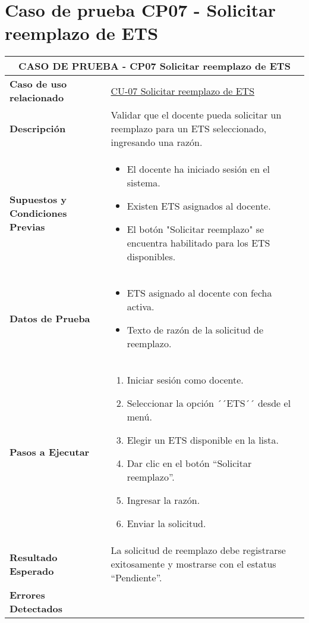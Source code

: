 \section{Caso de prueba CP07 - Solicitar reemplazo de ETS}

\begin{longtable}{|p{5cm}|p{10cm}|}
	\hline
	\multicolumn{2}{|c|}{\textbf{CASO DE PRUEBA - CP07 Solicitar reemplazo de ETS}} \\
	\hline
	\textbf{Caso de uso relacionado} & \hyperref[CU-07]{CU-07 Solicitar reemplazo de ETS} \\
	\hline
	\textbf{Descripción} & Validar que el docente pueda solicitar un reemplazo para un ETS seleccionado, ingresando una razón. \\
	\hline
	\textbf{Supuestos y Condiciones Previas} & 
	\begin{itemize}
		\item El docente ha iniciado sesión en el sistema.
		\item Existen ETS asignados al docente.
		\item El botón "Solicitar reemplazo" se encuentra habilitado para los ETS disponibles.
	\end{itemize} \\
	\hline
	\textbf{Datos de Prueba} & 
	\begin{itemize}
		\item ETS asignado al docente con fecha activa.
		\item Texto de razón de la solicitud de reemplazo.
	\end{itemize} \\
	\hline
	\textbf{Pasos a Ejecutar} & 
	\begin{enumerate}
		\item Iniciar sesión como docente.
		\item Seleccionar la opción ´´ETS´´ desde el menú.
		\item Elegir un ETS disponible en la lista.
		\item Dar clic en el botón “Solicitar reemplazo”.
		\item Ingresar la razón.
		\item Enviar la solicitud.
	\end{enumerate} \\
	\hline
	\textbf{Resultado Esperado} & 
	La solicitud de reemplazo debe registrarse exitosamente y mostrarse con el estatus “Pendiente”. \\
	\hline
	\textbf{Errores Detectados} & 
	\begin{itemize}

\end{itemize}
\end{longtable}
